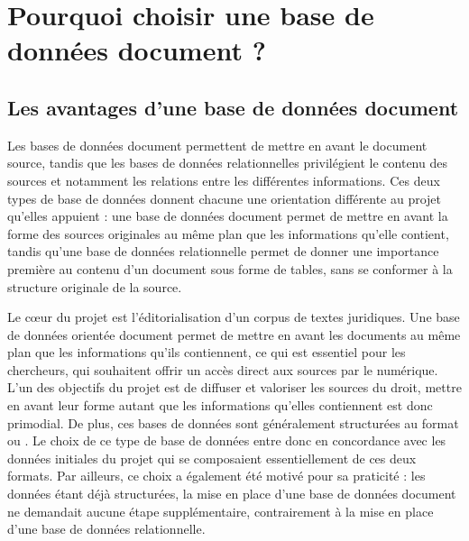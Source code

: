 \section{Pourquoi choisir une base de données document ? }
    \subsection{Les avantages d’une base de données document}
Les bases de données document permettent de mettre en avant le document source, tandis que les bases de données relationnelles privilégient le contenu des sources et notamment les relations entre les différentes informations. Ces deux types de base de données donnent chacune une orientation différente au projet qu'elles appuient : une base de données document permet de mettre en avant la forme des sources originales au même plan que les informations qu'elle contient, tandis qu'une base de données relationnelle permet de donner une importance première au contenu d'un document sous forme de tables, sans se conformer à la structure originale de la source. 
    
Le c\oe ur du projet \COREL est l'éditorialisation d'un corpus de textes juridiques. Une base de données orientée document permet de mettre en avant les documents au même plan que les informations qu'ils contiennent, ce qui est essentiel pour les chercheurs, qui souhaitent offrir un accès direct aux sources par le numérique. L'un des objectifs du projet \COREL est de diffuser et valoriser les sources du droit, mettre en avant leur forme autant que les informations qu'elles contiennent est donc primodial. De plus, ces bases de données sont généralement structurées au format \XML ou \JSON. Le choix de ce type de base de données entre donc en concordance avec les données initiales du projet qui se composaient essentiellement de ces deux formats. Par ailleurs, ce choix a également été motivé pour sa praticité : les données étant déjà structurées, la mise en place d'une base de données document ne demandait aucune étape supplémentaire, contrairement à la mise en place d'une base de données relationnelle. 

